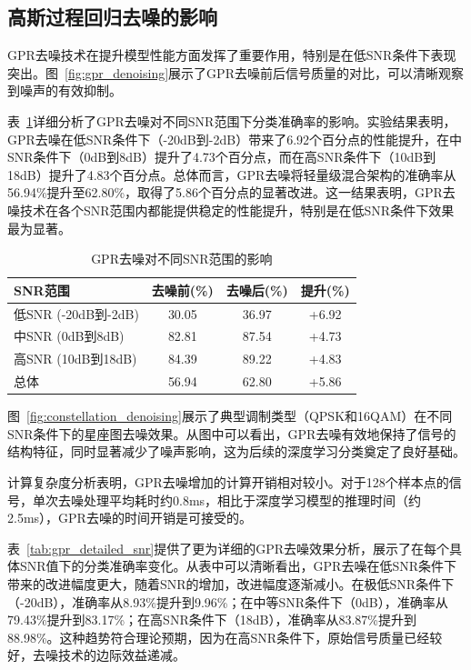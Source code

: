 \documentclass[conference]{IEEEtran}
\begin{document}
\subsection{高斯过程回归去噪的影响}

GPR去噪技术在提升模型性能方面发挥了重要作用，特别是在低SNR条件下表现突出。图~\ref{fig:gpr_denoising}展示了GPR去噪前后信号质量的对比，可以清晰观察到噪声的有效抑制。

表~\ref{tab:gpr_impact}详细分析了GPR去噪对不同SNR范围下分类准确率的影响。实验结果表明，GPR去噪在低SNR条件下（-20dB到-2dB）带来了6.92个百分点的性能提升，在中SNR条件下（0dB到8dB）提升了4.73个百分点，而在高SNR条件下（10dB到18dB）提升了4.83个百分点。总体而言，GPR去噪将轻量级混合架构的准确率从56.94\%提升至62.80\%，取得了5.86个百分点的显著改进。这一结果表明，GPR去噪技术在各个SNR范围内都能提供稳定的性能提升，特别是在低SNR条件下效果最为显著。

\begin{table}[h]
\centering
\caption{GPR去噪对不同SNR范围的影响}
\label{tab:gpr_impact}
\begin{tabular}{@{}lccc@{}}
\toprule
SNR范围 & 去噪前(\%) & 去噪后(\%) & 提升(\%) \\
\midrule
低SNR (-20dB到-2dB) & 30.05 & 36.97 & +6.92 \\
中SNR (0dB到8dB) & 82.81 & 87.54 & +4.73 \\
高SNR (10dB到18dB) & 84.39 & 89.22 & +4.83 \\
总体 & 56.94 & 62.80 & +5.86 \\
\bottomrule
\end{tabular}
\end{table}

图~\ref{fig:constellation_denoising}展示了典型调制类型（QPSK和16QAM）在不同SNR条件下的星座图去噪效果。从图中可以看出，GPR去噪有效地保持了信号的结构特征，同时显著减少了噪声影响，这为后续的深度学习分类奠定了良好基础。

计算复杂度分析表明，GPR去噪增加的计算开销相对较小。对于128个样本点的信号，单次去噪处理平均耗时约0.8ms，相比于深度学习模型的推理时间（约2.5ms），GPR去噪的时间开销是可接受的。

表~\ref{tab:gpr_detailed_snr}提供了更为详细的GPR去噪效果分析，展示了在每个具体SNR值下的分类准确率变化。从表中可以清晰看出，GPR去噪在低SNR条件下带来的改进幅度更大，随着SNR的增加，改进幅度逐渐减小。在极低SNR条件下（-20dB），准确率从8.93\%提升到9.96\%；在中等SNR条件下（0dB），准确率从79.43\%提升到83.17\%；在高SNR条件下（18dB），准确率从83.87\%提升到88.98\%。这种趋势符合理论预期，因为在高SNR条件下，原始信号质量已经较好，去噪技术的边际效益递减。
\end{document}

